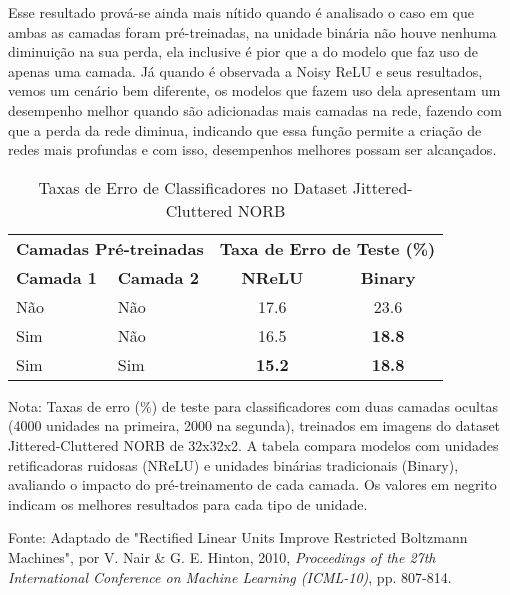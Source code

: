 Esse resultado prová-se ainda mais nítido quando é analisado o caso em que ambas as camadas foram pré-treinadas, na unidade binária não houve nenhuma diminuição na sua perda, ela inclusive é pior que a do modelo que faz uso de apenas uma camada. Já quando é observada a Noisy ReLU e seus resultados, vemos um cenário bem diferente, os modelos que fazem uso dela apresentam um desempenho melhor quando são adicionadas mais camadas na rede, fazendo com que a perda da rede diminua, indicando que essa função permite a criação de redes mais profundas e com isso, desempenhos melhores possam ser alcançados.

\begin{table}[ht]
    \centering
    \begin{threeparttable}
        \caption{Taxas de Erro de Classificadores no Dataset Jittered-Cluttered NORB}
        \label{tab:nrelu-norb-comparativo}
        \begin{tabular}{llcc}
            \toprule
            \multicolumn{2}{c}{\textbf{Camadas Pré-treinadas}} & \multicolumn{2}{c}{\textbf{Taxa de Erro de Teste (\%)}} \\
            \cmidrule(r){1-2} \cmidrule(r){3-4} %
            \textbf{Camada 1} & \textbf{Camada 2} & \textbf{NReLU} & \textbf{Binary} \\
            \midrule
            
            Não & Não & 17.6 & 23.6 \\
            Sim & Não & 16.5 & \textbf{18.8} \\
            Sim & Sim & \textbf{15.2} & \textbf{18.8} \\
            
            \bottomrule
        \end{tabular}
        
        \begin{tablenotes}[para]
            \small
            \item[] Nota: Taxas de erro (\%) de teste para classificadores com duas camadas ocultas (4000 unidades na primeira, 2000 na segunda), treinados em imagens do dataset Jittered-Cluttered NORB de 32x32x2. A tabela compara modelos com unidades retificadoras ruidosas (NReLU) e unidades binárias tradicionais (Binary), avaliando o impacto do pré-treinamento de cada camada. Os valores em negrito indicam os melhores resultados para cada tipo de unidade.
            \item[] Fonte: Adaptado de "Rectified Linear Units Improve Restricted Boltzmann Machines", por V. Nair \& G. E. Hinton, 2010, \textit{Proceedings of the 27th International Conference on Machine Learning (ICML-10)}, pp. 807-814.
        \end{tablenotes}
        
    \end{threeparttable}
\end{table}

